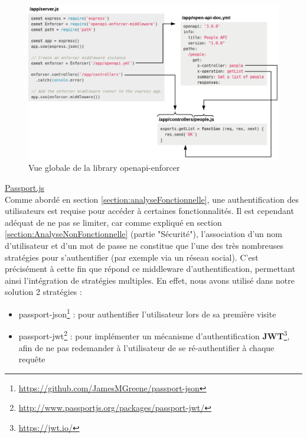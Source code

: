 \begin{figure}[H]
    \includegraphics[width=\textwidth,height=\textheight,keepaspectratio]{images/libraries/openapi-enforcer.png}
    \centering
    \caption[Vue globale de la \gls{library} openapi-enforcer]{Vue globale de la \gls{library} openapi-enforcer 
        \footnotemark
    }
    \label{fig:OASEnforcer}
\end{figure}

\noindent\underline{\href{http://www.passportjs.org/}{Passport.js}}\\

Comme abordé en section \ref{section:analyseFonctionnelle}, une authentification des utilisateurs est requise pour accéder à certaines fonctionnalités.
Il est cependant adéquat de ne pas se limiter, car comme expliqué en section \ref{section:AnalyseNonFonctionnelle} (partie "Sécurité"), l'association d'un nom d'utilisateur et d'un mot de passe ne constitue que l'une des très nombreuses stratégies pour s'authentifier (par exemple via un réseau social).
C'est précisément à cette fin que répond ce \gls{middleware} d'authentification, permettant ainsi l'intégration de stratégies multiples.
En effet, nous avons utilisé dans notre solution 2 stratégies :

\begin{itemize}[nosep,noitemsep,topsep=0pt,partopsep=0pt,after=\vspace*{2pt}]
    \item passport-json\footnote{
        \url{https://github.com/JamesMGreene/passport-json}
    } : pour authentifier l'utilisateur lors de sa première visite
    \item passport-jwt\footnote{
        \url{http://www.passportjs.org/packages/passport-jwt/}
        } : pour implémenter un mécanisme d'authentification \textbf{JWT}\footnote{
            \url{https://jwt.io/}
        }, afin de ne pas redemander à l'utilisateur de se ré-authentifier à chaque requête
\end{itemize}


